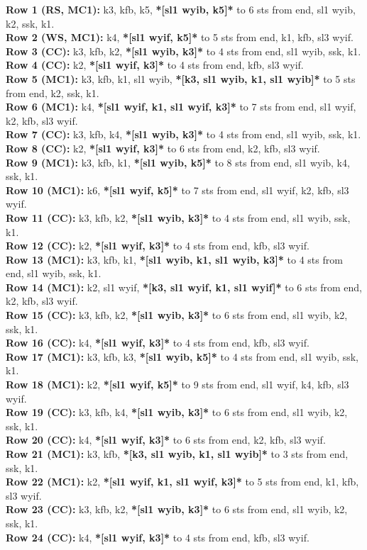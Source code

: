 \documentclass[12pt]{article}
\newcommand{\rowDir}[1]{\textbf{#1:}} %
\renewcommand{\repeat}[1]{\textbf{*[#1]*}} %
\begin{document}
\rowDir{Row 1 (RS, MC1)} k3, kfb, k5, \repeat{sl1 wyib, k5} to 6 sts from end, sl1 wyib, k2, ssk, k1. \\
\rowDir{Row 2 (WS, MC1)} k4, \repeat{sl1 wyif, k5} to 5 sts from end, k1, kfb, sl3 wyif. \\
\rowDir{Row 3 (CC)} k3, kfb, k2, \repeat{sl1 wyib, k3} to 4 sts from end, sl1 wyib, ssk, k1. \\
\rowDir{Row 4 (CC)} k2, \repeat{sl1 wyif, k3} to 4 sts from end, kfb, sl3 wyif. \\
\rowDir{Row 5 (MC1)} k3, kfb, k1, sl1 wyib, \repeat{k3, sl1 wyib, k1, sl1 wyib} to 5 sts from end, k2, ssk, k1. \\
\rowDir{Row 6 (MC1)} k4, \repeat{sl1 wyif, k1, sl1 wyif, k3} to 7 sts from end, sl1 wyif, k2, kfb, sl3 wyif. \\
\rowDir{Row 7 (CC)} k3, kfb, k4, \repeat{sl1 wyib, k3} to 4 sts from end, sl1 wyib, ssk, k1. \\
\rowDir{Row 8 (CC)} k2, \repeat{sl1 wyif, k3} to 6 sts from end, k2, kfb, sl3 wyif. \\
\rowDir{Row 9 (MC1)} k3, kfb, k1, \repeat{sl1 wyib, k5} to 8 sts from end, sl1 wyib, k4, ssk, k1. \\
\rowDir{Row 10 (MC1)} k6, \repeat{sl1 wyif, k5} to 7 sts from end, sl1 wyif, k2, kfb, sl3 wyif. \\
\rowDir{Row 11 (CC)} k3, kfb, k2, \repeat{sl1 wyib, k3} to 4 sts from end, sl1 wyib, ssk, k1. \\
\rowDir{Row 12 (CC)} k2, \repeat{sl1 wyif, k3} to 4 sts from end, kfb, sl3 wyif. \\
\rowDir{Row 13 (MC1)} k3, kfb, k1, \repeat{sl1 wyib, k1, sl1 wyib, k3} to 4 sts from end, sl1 wyib, ssk, k1. \\
\rowDir{Row 14 (MC1)} k2, sl1 wyif, \repeat{k3, sl1 wyif, k1, sl1 wyif} to 6 sts from end, k2, kfb, sl3 wyif. \\
\rowDir{Row 15 (CC)} k3, kfb, k2, \repeat{sl1 wyib, k3} to 6 sts from end, sl1 wyib, k2, ssk, k1. \\
\rowDir{Row 16 (CC)} k4, \repeat{sl1 wyif, k3} to 4 sts from end, kfb, sl3 wyif. \\
\rowDir{Row 17 (MC1)} k3, kfb, k3, \repeat{sl1 wyib, k5} to 4 sts from end, sl1 wyib, ssk, k1. \\
\rowDir{Row 18 (MC1)} k2, \repeat{sl1 wyif, k5} to 9 sts from end, sl1 wyif, k4, kfb, sl3 wyif. \\
\rowDir{Row 19 (CC)} k3, kfb, k4, \repeat{sl1 wyib, k3} to 6 sts from end, sl1 wyib, k2, ssk, k1. \\
\rowDir{Row 20 (CC)} k4, \repeat{sl1 wyif, k3} to 6 sts from end, k2, kfb, sl3 wyif. \\
\rowDir{Row 21 (MC1)} k3, kfb, \repeat{k3, sl1 wyib, k1, sl1 wyib} to 3 sts from end, ssk, k1. \\
\rowDir{Row 22 (MC1)} k2, \repeat{sl1 wyif, k1, sl1 wyif, k3} to 5 sts from end, k1, kfb, sl3 wyif. \\
\rowDir{Row 23 (CC)} k3, kfb, k2, \repeat{sl1 wyib, k3} to 6 sts from end, sl1 wyib, k2, ssk, k1. \\
\rowDir{Row 24 (CC)} k4, \repeat{sl1 wyif, k3} to 4 sts from end, kfb, sl3 wyif.
\end{document}
